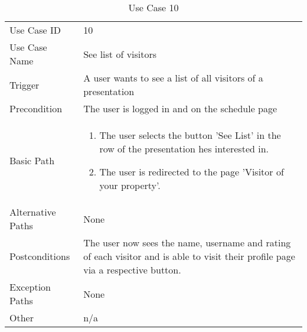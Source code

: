 \begin{table}[H]
\centering
\label{table-use-case-10}
\begin{tabular}{|p{3cm}|p{10cm}}
Use Case ID       & 10                                                        \\
Use Case Name     & See list of visitors                            \\
Trigger           & A user wants to see a list of all visitors of a presentation\\
Precondition      & The user is logged in and on the schedule page             \\
Basic Path        & \begin{enumerate}
\item The user selects the button 'See List' in the row of the presentation hes
interested in.
\item The user is redirected to the page 'Visitor of your property'. 
\end{enumerate} 
     \\
Alternative Paths & None                          \\
Postconditions    & The user now sees the name, username and rating of each
visitor and is able to visit their profile page via a
respective button.	\\
Exception Paths   & None			\\
Other             & n/a                                                                                                                                                                                                        
\end{tabular}
\caption{Use Case 10}
\end{table}

